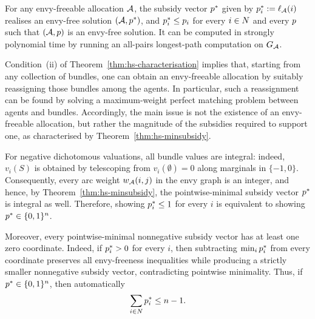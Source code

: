 \begin{theorem}[\cite{HS19}]
\label{thm:hs-minsubsidy}
For any envy-freeable allocation $\mathcal{A}$, the subsidy vector $p^{*}$
given by $p^{*}_i := \ell_{\mathcal{A}}(i)$ realises an envy-free solution
$(\mathcal{A}, p^{*})$, and $p^{*}_i \le p_i$ for every
$i \in N$ and every $p$ such that $(\mathcal{A},p)$ is an
envy-free solution. It can be computed in strongly polynomial time by running
an all-pairs longest-path computation on $G_{\mathcal{A}}$.
\end{theorem}

Condition~(ii) of Theorem~\ref{thm:hs-characterisation} implies that, starting from any collection of bundles, one can obtain an envy-freeable allocation by suitably reassigning those bundles among the agents. In particular, such a reassignment can be found by solving a maximum-weight perfect matching problem between agents and bundles. Accordingly, the main issue is not the existence of an envy-freeable allocation, but rather the magnitude of the subsidies required to support one, as characterised by Theorem~\ref{thm:hs-minsubsidy}. 


For negative dichotomous valuations, all bundle values are integral:
indeed, $v_i(S)$ is obtained by telescoping from $v_i(\emptyset)=0$
along marginals in $\{-1,0\}$. Consequently, every arc weight
$w_{\mathcal{A}}(i,j)$ in the envy graph is an integer, and hence, by
Theorem~\ref{thm:hs-minsubsidy}, the pointwise-minimal subsidy vector
$p^{*}$ is integral as well. Therefore, showing
$p^{*}_i\leq 1$ for every $i$ is equivalent to showing
$p^{*}\in\{0,1\}^n$.

Moreover, every pointwise-minimal nonnegative subsidy vector has at
least one zero coordinate. Indeed, if $p^{*}_i>0$ for every
$i$, then subtracting $\min_ip^{*}_i$ from every coordinate
preserves all envy-freeness inequalities while producing a strictly
smaller nonnegative subsidy vector, contradicting pointwise minimality.
Thus, if $p^{*}\in\{0,1\}^n$, then automatically
\[
    \sum_{i\in N}p^{*}_i\leq n-1.
\]






